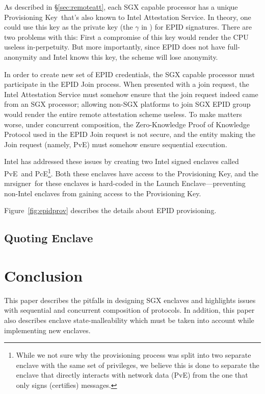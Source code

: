 \documentclass[letterpaper]{article}
\newcommand{\secref}[1]{\S\ref{#1}}
\newcommand{\mrsigner}{\textsf{mrsigner}}
\newcommand{\pve}{\textsf{PvE}}
\newcommand{\pce}{\textsf{PcE}}
\newcommand{\launchenclave}{\textsf{Launch Enclave}}
\newcommand{\pk}{\textsf{Provisioning Key}}
\begin{document}
  As described in \secref{sec:remoteatt}, each SGX capable processor
  has a unique \pk\ that's also known to Intel Attestation Service. In
  theory, one could use this key as the private key (the $\gamma$ in
  \cite{epid}) for EPID signatures. There are two problems with this:
  First a compromise of this key would render the CPU useless
  in-perpetuity. But more importantly, since EPID does not have
  full-anonymity and Intel knows this key, the scheme will lose
  anonymity.

  In order to create new set of EPID credentials, the SGX capable
  processor must participate in the EPID Join process. When
  presented with a join request, the Intel Attestation Service must
  somehow ensure that the join request indeed came from an SGX
  processor; allowing non-SGX platforms to join SGX EPID group would
  render the entire remote attestation scheme useless. To make matters
  worse, under concurrent composition, the Zero-Knowledge Proof of
  Knowledge Protocol used in the EPID Join request is not secure, and
  the entity making the Join request (namely, \pve) must somehow
  ensure sequential execution.

  Intel has addressed these issues by creating two Intel signed
  enclaves called \pve\ and \pce\footnote{While we not sure why the
    provisioning process was split into two separate enclave with the
    same set of privileges, we believe this is done to separate the
    enclave that directly interacts with network data (\pve) from the
    one that only signs (certifies) messages.}. Both these enclaves
  have access to the Provisioning Key, and the \mrsigner\ for these
  enclaves is hard-coded in the \launchenclave---preventing non-Intel
  enclaves from gaining access to the Provisioning Key.

  Figure~\ref{fig:epidprov} describes the details about EPID
  provisioning.

\subsection{Quoting Enclave}
\label{ssec:qe}

\section{Conclusion}
\label{sec:conclusion}
  This paper describes the pitfalls in designing SGX enclaves and
  highlights issues with sequential and concurrent composition of
  protocols. In addition, this paper also describes enclave
  state-malleability which must be taken into account while
  implementing new enclaves.
\end{document}
